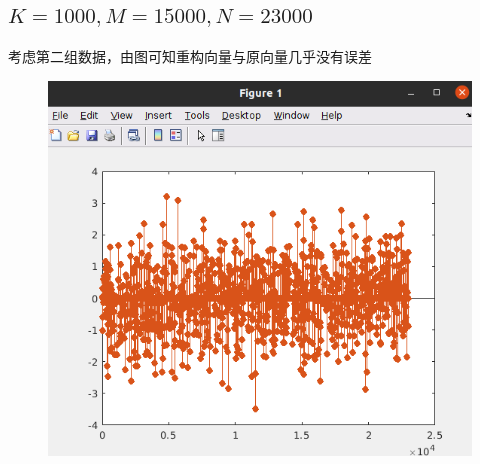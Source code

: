 \documentclass{article}
\begin{document}
\subsection{$ K=1000,M=15000,N=23000 $}
考虑第二组数据，由图可知重构向量与原向量几乎没有误差
\begin{figure}[H]
	\centering
	\includegraphics[scale=0.6]{k1000.png}
\end{figure}
\end{document}
